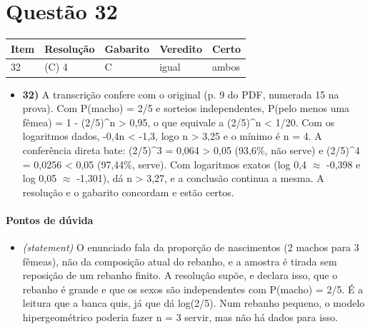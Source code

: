 \documentclass{article}%
\begin{document}
\section*{Questão 32}%
\begin{longtable}{@{}p{} p{} p{} p{} p{}@{}}\toprule Item & Resolução & Gabarito & Veredito & Certo \\ \midrule
32 & (C) 4 & C & igual & ambos \\
\bottomrule\end{longtable}%
\begin{itemize}%
\item%
\textbf{32)} A transcrição confere com o original (p. 9 do PDF, numerada 15 na prova). Com P(macho) = 2/5 e sorteios independentes, P(pelo menos uma fêmea) = 1 - (2/5)\^{}n > 0,95, o que equivale a (2/5)\^{}n < 1/20. Com os logaritmos dados, -0,4n < -1,3, logo n > 3,25 e o mínimo é n = 4. A conferência direta bate: (2/5)\^{}3 = 0,064 > 0,05 (93,6\%, não serve) e (2/5)\^{}4 = 0,0256 < 0,05 (97,44\%, serve). Com logaritmos exatos (log 0,4 $\approx$ -0,398 e log 0,05 $\approx$ -1,301), dá n > 3,27, e a conclusão continua a mesma. A resolução e o gabarito concordam e estão certos.%
\end{itemize}%
\paragraph{Pontos de dúvida}%
\begin{itemize}%
\item%
\textit{(statement)} O enunciado fala da proporção de nascimentos (2 machos para 3 fêmeas), não da composição atual do rebanho, e a amostra é tirada sem reposição de um rebanho finito. A resolução supõe, e declara isso, que o rebanho é grande e que os sexos são independentes com P(macho) = 2/5. É a leitura que a banca quis, já que dá log(2/5). Num rebanho pequeno, o modelo hipergeométrico poderia fazer n = 3 servir, mas não há dados para isso.%
\end{itemize}%
\end{document}
